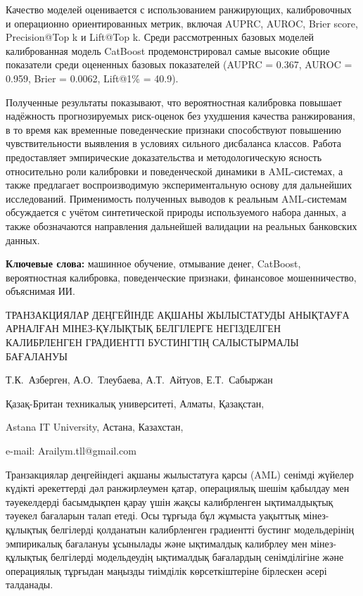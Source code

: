 Качество моделей оценивается с использованием ранжирующих, калибровочных
и операционно ориентированных метрик, включая AUPRC, AUROC, Brier score,
Precision@Top k и Lift@Top k. Среди рассмотренных базовых моделей
калиброванная модель CatBoost продемонстрировал самые высокие общие
показатели среди оцененных базовых показателей (AUPRC = 0.367, AUROC =
0.959, Brier = 0.0062, Lift@1\% = 40.9).

Полученные результаты показывают, что вероятностная калибровка повышает
надёжность прогнозируемых риск-оценок без ухудшения качества
ранжирования, в то время как временные поведенческие признаки
способствуют повышению чувствительности выявления в условиях сильного
дисбаланса классов. Работа предоставляет эмпирические доказательства и
методологическую ясность относительно роли калибровки и поведенческой
динамики в AML-системах, а также предлагает воспроизводимую
экспериментальную основу для дальнейших исследований. Применимость
полученных выводов к реальным AML-системам обсуждается с учётом
синтетической природы используемого набора данных, а также обозначаются
направления дальнейшей валидации на реальных банковских данных.

{\bfseries Ключевые слова:} машинное обучение, отмывание денег, CatBoost,
вероятностная калибровка, поведенческие признаки, финансовое
мошенничество, объяснимая ИИ.

\begin{header}
ТРАНЗАКЦИЯЛАР ДЕҢГЕЙІНДЕ АҚШАНЫ ЖЫЛЫСТАТУДЫ АНЫҚТАУҒА АРНАЛҒАН МІНЕЗ-ҚҰЛЫҚТЫҚ БЕЛГІЛЕРГЕ НЕГІЗДЕЛГЕН КАЛИБРЛЕНГЕН ГРАДИЕНТТІ БУСТИНГТІҢ САЛЫСТЫРМАЛЫ БАҒАЛАНУЫ

Т.К.~Азберген,
А.О.~Тлеубаева\envelope,
А.Т.~Айтуов,
Е.Т.~Сабыржан
\end{header}

\begin{affil}
Қазақ-Британ техникалық университеті, Алматы, Қазақстан,
       
Astana IT University, Астана, Казахстан,

e-mail: Arailym.tll@gmail.com
\end{affil}

Транзакциялар деңгейіндегі ақшаны жылыстатуға қарсы (AML) сенімді
жүйелер күдікті әрекеттерді дәл ранжирлеумен қатар, операциялық шешім
қабылдау мен тәуекелдерді басымдықпен қарау үшін жақсы калибрленген
ықтималдықтық тәуекел бағаларын талап етеді. Осы тұрғыда бұл жұмыста
уақыттық мінез-құлықтық белгілерді қолданатын калибрленген градиентті
бустинг модельдерінің эмпирикалық бағалануы ұсынылады және ықтималдық
калибрлеу мен мінез-құлықтық белгілерді модельдеудің ықтималдық
бағалардың сенімділігіне және операциялық тұрғыдан маңызды тиімділік
көрсеткіштеріне бірлескен әсері талданады.

